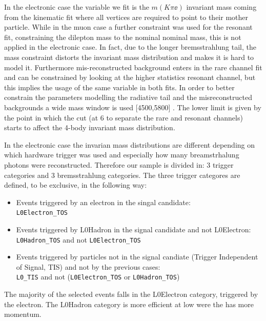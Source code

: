 In the electronic case the variable we fit is the $m(K\pi\ee)$ invariant mass coming from the kinematic
fit where all vertices are required to point to their mother particle. 
While in the muon case a further constraint was used for the resonant fit, constraining the dilepton mass
to the nominal \jpsi nominal mass, this is not applied in the electronic case.
In fact, due to the longer bremsstrahlung tail, the \jpsi mass constraint distorts the invariant mass distribution
and makes it is hard to model it. Furthermore mis-reconstructed background enters in the rare channel fit and
can be constrained by looking at the higher statistics resonant channel, but this implies the usage of the same variable in both fits.
In order to better constrain the parameters modelling the radiative tail and the misreconstructed
backgrounds a wide mass window is used [4500,5800] \mevcc. The lower limit is given
by the point in which the \qsq cut (at 6 \gevgevcccc to separate the rare and resonant channels)
starts to affect the 4-body invariant mass distribution.

In the electronic case the invarian mass distributions are different depending on which hardware
trigger was used and especially how many breamstrhalung photons were reconstructed.
Therefore our sample is divided in: 3 trigger categories and 3 bremsstrahlung categories.
The three trigger categores are defined, to be exclusive, in the following way:

\begin{itemize}
\item Events triggered by an electron in the singal candidate: \\
{\centering \verb!L0Electron_TOS! }
\item Events triggered by L0Hadron in the signal candidate and not L0Electron: \\
{\centering \verb!L0Hadron_TOS! and not \verb!L0Electron_TOS! }
\item Events triggered by particles not in the signal candiate (Trigger Independent of Signal, TIS) and not by the previous cases: \\
{\centering \verb!L0_TIS! and not (\verb!L0Electron_TOS! or \verb!L0Hadron_TOS!) }
\end{itemize}

The majority of the selected events falls in the L0Electron category, triggered by the electron.
The L0Hadron category is more efficient at low \qsq were the \Kstar has more momentum.

